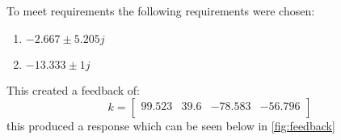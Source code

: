 To meet requirements the following requirements were chosen: \begin{enumerate}
\item$-2.667 \pm 5.205j$\\
\item$-13.333 \pm 1j$\end{enumerate}
This created a feedback of: 
\begin{equation}k = \begin{bmatrix}
99.523&39.6&-78.583&-56.796\\
\end{bmatrix}
\end{equation}this produced a response which can be seen below in \autoref{fig:feedback}
